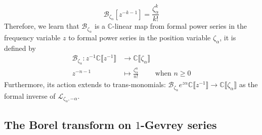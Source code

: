 \documentclass{article}
\theoremstyle{definition}
\newcommand{\maps}{\colon}
\newcommand{\C}{\mathbb{C}}
\newcommand{\laplace}{\mathcal{L}}
\newcommand{\borel}{\mathcal{B}}
\begin{document}
       \[\borel_{\zeta_\alpha}\left[z^{-k-1}\right]=\frac{\zeta_\alpha^k}{k!}\]
 Therefore, we learn that $\borel_{\zeta_\alpha}$ is a $\C$-linear map from formal power series in the frequency variable $z$ to formal power series in the position variable $\zeta_\alpha$, it is defined by 
 \begin{align*}
     \borel_{\zeta_\alpha}\colon z^{-1}\C\llbracket z^{-1}\rrbracket &\to \C\llbracket \zeta_\alpha \rrbracket  \\
     z^{-n-1}& \mapsto \frac{\zeta_\alpha^n}{n!} \qquad \text{ when } n\geq 0
 \end{align*}
 Furthermore, its action extends to trans-monomials: $\borel_{\zeta_\alpha}e^{z\alpha}\C\llbracket z^{-1}\rrbracket\to \C\llbracket \zeta_\alpha \rrbracket$ as the formal inverse of $\laplace_{\zeta_\alpha,-\alpha}$. 

  

\subsection{The Borel transform on $1$-Gevrey series}

\end{document}

